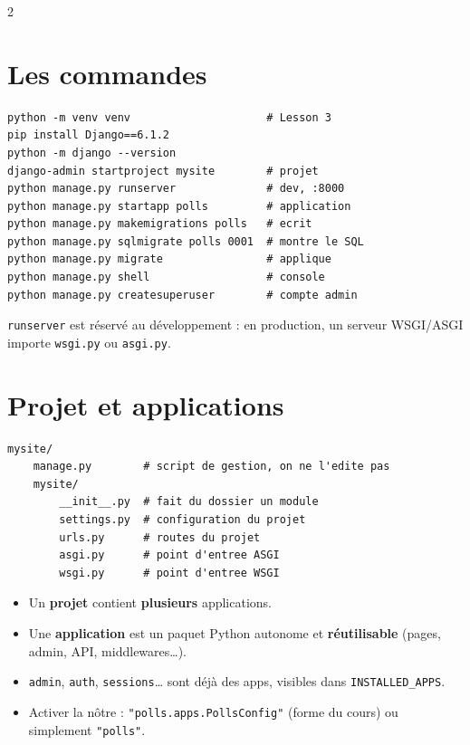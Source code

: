 \documentclass[a4paper,10pt]{article}
\newcommand{\co}[1]{\texttt{\textcolor{codefg}{#1}}}
\begin{document}
\vspace{0.5em}
\begin{multicols}{2}

\section{Les commandes}

\begin{lstlisting}
python -m venv venv                     # Lesson 3
pip install Django==6.1.2
python -m django --version
django-admin startproject mysite        # projet
python manage.py runserver              # dev, :8000
python manage.py startapp polls         # application
python manage.py makemigrations polls   # ecrit
python manage.py sqlmigrate polls 0001  # montre le SQL
python manage.py migrate                # applique
python manage.py shell                  # console
python manage.py createsuperuser        # compte admin
\end{lstlisting}

\vspace{0.3em}
\co{runserver} est réservé au développement : en production, un serveur
WSGI/ASGI importe \co{wsgi.py} ou \co{asgi.py}.

\section{Projet et applications}

\begin{lstlisting}
mysite/
    manage.py        # script de gestion, on ne l'edite pas
    mysite/
        __init__.py  # fait du dossier un module
        settings.py  # configuration du projet
        urls.py      # routes du projet
        asgi.py      # point d'entree ASGI
        wsgi.py      # point d'entree WSGI
\end{lstlisting}

\begin{itemize}
  \item Un \textbf{projet} contient \textbf{plusieurs} applications.
  \item Une \textbf{application} est un paquet Python autonome et
        \textbf{réutilisable} (pages, admin, API, middlewares\dots).
  \item \co{admin}, \co{auth}, \co{sessions}\dots{} sont déjà des apps,
        visibles dans \co{INSTALLED\_APPS}.
  \item Activer la nôtre : \co{"polls.apps.PollsConfig"} (forme du cours)
        ou simplement \co{"polls"}.
\end{itemize}


\end{multicols}
\end{document}
